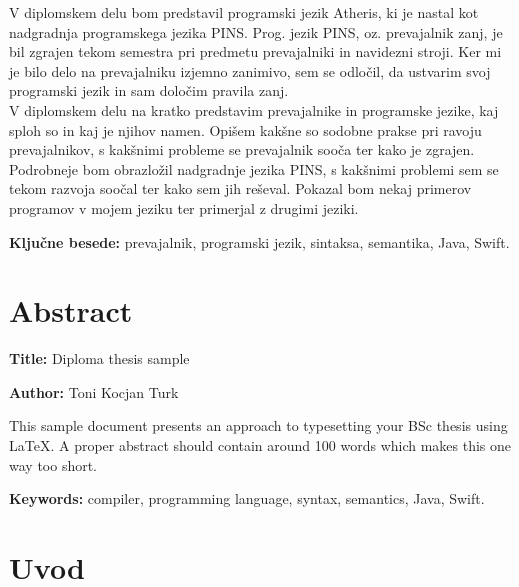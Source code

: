 \documentclass[a4paper, 12pt]{book}
\newcommand{\ttitleEn}{Diploma thesis sample}
\newcommand{\tauthor}{Toni Kocjan Turk}
\newcommand{\tkeywords}{prevajalnik, programski jezik, sintaksa, semantika, Java, Swift}
\newcommand{\tkeywordsEn}{compiler, programming language, syntax, semantics, Java, Swift}
\newcommand{\clearemptydoublepage}{\newpage{\pagestyle{empty}\cleardoublepage}}
\begin{document}
V diplomskem delu bom predstavil programski jezik Atheris, ki je nastal kot nadgradnja programskega jezika PINS. Prog. jezik PINS, oz. prevajalnik zanj, je bil zgrajen tekom semestra pri predmetu prevajalniki in navidezni stroji. Ker mi je bilo delo na prevajalniku izjemno zanimivo, sem se odločil, da ustvarim svoj programski jezik in sam določim pravila zanj.\\
\indent V diplomskem delu na kratko predstavim prevajalnike in programske jezike, kaj sploh so in kaj je njihov namen. Opišem kakšne so sodobne prakse pri ravoju prevajalnikov, s kakšnimi probleme se prevajalnik sooča ter kako je zgrajen. \\
\indent Podrobneje bom obrazložil nadgradnje jezika PINS, s kakšnimi problemi sem se tekom razvoja soočal ter kako sem jih reševal. Pokazal bom nekaj primerov programov v mojem jeziku ter primerjal z drugimi jeziki.

\noindent 

\bigskip

\noindent\textbf{Ključne besede:} \tkeywords.
\clearemptydoublepage

\chapter*{Abstract}

\noindent\textbf{Title:} \ttitleEn
\bigskip

\noindent\textbf{Author:} \tauthor
\bigskip

\noindent This sample document presents an approach to typesetting your BSc thesis using \LaTeX. 
A proper abstract should contain around 100 words which makes this one way too short.
\bigskip

\noindent\textbf{Keywords:} \tkeywordsEn.
\clearemptydoublepage

\mainmatter
\setcounter{page}{1}
\pagestyle{fancy}

\chapter{Uvod}
\end{document}
